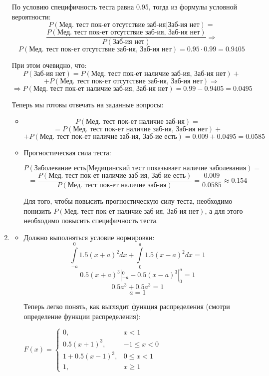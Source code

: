 \documentclass[12pt, a4paper]{article}\usepackage[]{graphicx}\usepackage[]{color}
\begin{document}
\begin{enumerate}
По условию специфичность теста равна 0.95, тогда из формулы условной вероятности:
$$P(\text{Мед. тест пок-ет отсутствие заб-ия} | \text{Заб-ия нет}) = $$
$$\dfrac{P(\text{Мед. тест пок-ет отсутствие заб-ия, Заб-ия нет})}{P(\text{Заб-ия нет})} \Rightarrow$$
$$P(\text{Мед. тест пок-ет отсутствие заб-ия, Заб-ия нет}) =0.95 \cdot 0.99 = 0.9405$$

При этом очевидно, что:
$$P(\text{Заб-ия нет}) = P(\text{Мед. тест пок-ет наличие заб-ия, Заб-ия нет}) + $$
$$+ P(\text{Мед. тест пок-ет отсутствие заб-ия, Заб-ия нет}) \Rightarrow$$
$$\Rightarrow P(\text{Мед. тест пок-ет наличие заб-ия, Заб-ия нет}) = 0.99 - 0.9405 = 0.0495$$

Теперь мы готовы отвечать на заданные вопросы:

\begin{itemize}
\item
$$P(\text{Мед. тест пок-ет наличие заб-ия}) = $$
$$= P(\text{Мед. тест пок-ет наличие заб-ия, Заб-ия нет}) + $$
$$+ P(\text{Мед. тест пок-ет наличие заб-ия, Заб-ие есть}) = 0.009+0.0495 = 0.0585 $$

\item Прогностическая сила теста:

$$P(\text{Заболевание есть} | \text{Медицинский тест показывает наличие заболевания}) = $$
$$= \dfrac{P(\text{Мед. тест пок-ет наличие заб-ия, Заб-ие есть})}{P(\text{Мед. тест пок-ет наличие заб-ия}) } = \dfrac{0.009}{0.0585} \approx 0.154$$

Для того, чтобы повысить прогностическую силу теста, необходимо понизить $P(\text{Мед. тест пок-ет наличие заб-ия, Заб-ия нет}) $, а для этого необходимо повысить специфичность теста.

\end{itemize}

\item
\begin{itemize}
\item
Должно выполняться условие нормировки:
$$\int \limits_{-a}^0 1.5(x+a)^2 dx + \int \limits_0^a 1.5(x- a)^2  dx = 1   $$
$$0.5(x+a)^3 |_{-a}^0 + 0.5(x- a)^3 |_0^a  = 1   $$
$$0.5a^3 + 0.5a^3 = 1$$
$$a = 1$$

Теперь легко понять, как выглядит функция распределения (смотри определение функции распределения):

$F(x) = \begin{cases}
0, & x < 1 \\
0.5 (x+1)^3, & -1 \leqslant x <0 \\
1 + 0.5 (x-1)^3, & 0 \leqslant x < 1 \\
1, & x \geqslant 1
\end{cases}$


\end{itemize}
\end{enumerate}
\end{document}
